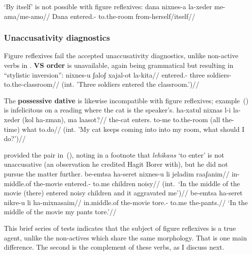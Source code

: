 `By itself' is not possible with figure reflexives:
\ex \begingl
	\gla\ljudge{*}dana nixnes-a la-xeder me-a{\ts}ma/me-a{\ts}mo//
	\glb Dana entered.- to.the-room from-herself/itself//
	\endgl
\xe

		\subsubsection{Unaccusativity diagnostics} \label{vz:tnif:figrefl:unacc}
Figure reflexives fail the accepted unaccusativity diagnostics, unlike non-active verbs in {\tnif}. \textbf{VS order} is unavailable, again being grammatical but resulting in ``stylistic inversion'':
\ex \begingl
	\gla\ljudge{\#}nixnes-u ʃaloʃ xajal-ot la-kita//
	\glb entered.- three soldiers- to.the-classroom//
	\glft (int. 'Three soldiers entered the classroom.')//
	\endgl
\xe

The \textbf{possessive dative} is likewise incompatible with figure reflexives; example~(\nextx) is infelicitous on a reading where the cat is the speaker's.
\ex \begingl
	\gla\ljudge{\#}ha-xatul nixnas l-i la-xeder (kol ha-zman), ma laasot?//
	\glb the-cat enters. to-me to.the-room (all the-time) what to.do//
	\glft (int. 'My cat keeps coming into into my room, what should I do?')//
	\endgl
\xe

\cite[134]{shlonsky87} provided the pair in~(\nextx), noting in a footnote that \emph{lehikans} `to enter' is not unaccusative (an observation he credited Hagit Borer with), but he did not pursue the matter further.
\pex
	\a \ljudge{*} \begingl
		\gla be-emtsa ha-seret nixnes-u li jeladim raaʃanim//
		\glb in-middle.of the-movie entered.- to.me children noisy//
		\glft (int.~`In the middle of the movie (there) entered noisy children and it aggravated me')//
		\endgl
	\a \begingl
		\gla be-emtsa ha-seret nikre-u li ha-mixnasaim//
		\glb in.middle.of the-movie tore.- to.me the-pants.//
		\glft `In the middle of the movie my pants tore.'//
		\endgl
\xe

This brief series of tests indicates that the subject of figure reflexives is a true agent, unlike the non-actives which share the same morphology. That is one main difference. The second is the complement of these verbs, as I discuss next.

